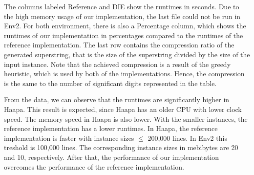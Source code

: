 \documentclass[english,twoside,censored,csm,algorithms-track-2020]{HYthesisML}
\theoremstyle{plain}
\theoremstyle{definition}
\begin{document}
  The columns labeled Reference and DIE show the runtimes in seconds.
  Due to the high memory usage of our implementation, the last file could not be run in Env2.
  For both environment, there is
  also a Percentage column, which shows the runtimes of our implementation in percentages compared
  to the runtimes of the reference implementation. The last row contains the compression ratio of the
  generated superstring, that is the size of the superstring divided by the size of the input instance.
  Note that the achieved compression is a result of the greedy heuristic, which is used by both
  of the implementations. Hence, the compression is the same to the number of significant digits
  represented in the table.

  From the data, we can observe that the runtimes are significantly higher in Haapa. This result is
  expected, since Haapa has an older CPU with lower clock speed. The memory speed in Haapa is
  also lower. With the smaller instances, the reference implementation has a lower runtimes.
  In Haapa, the reference implementation is faster with instance sizes $\leq$ 200,000 lines.
  In Env2 this treshold is 100,000 lines. The corresponding instance sizes in mebibytes are
  20 and 10, respectively. After that, the performance of our implementation
  overcomes the performance of the reference implementation.
\end{document}
